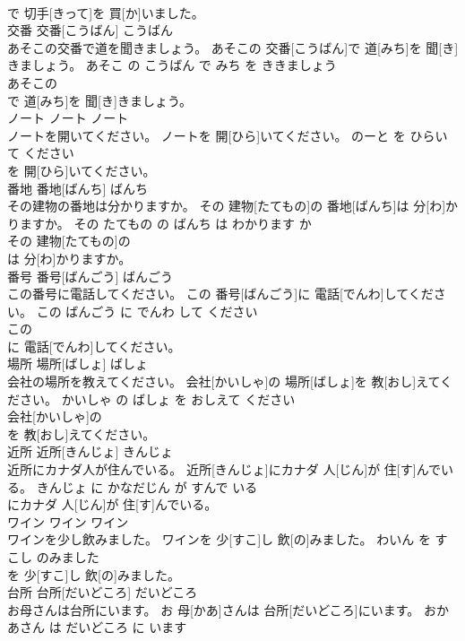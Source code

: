 \documentclass[8pt]{extreport}
\begin{document}
\begin{CJK}{UTF8}{min}
\\	で 切手[きって]を 買[か]いました。		
\\	交番	交番[こうばん]	こうばん	
\\	あそこの交番で道を聞きましょう。	あそこの 交番[こうばん]で 道[みち]を 聞[き]きましょう。	あそこ の こうばん で みち を ききましょう	
\\	あそこの
\\	で 道[みち]を 聞[き]きましょう。		
\\	ノート	ノート	ノート	
\\	ノートを開いてください。	ノートを 開[ひら]いてください。	のーと を ひらいて ください	
\\	を 開[ひら]いてください。		
\\	番地	番地[ばんち]	ばんち	
\\	その建物の番地は分かりますか。	その 建物[たてもの]の 番地[ばんち]は 分[わ]かりますか。	その たてもの の ばんち は わかります か	
\\	その 建物[たてもの]の
\\	は 分[わ]かりますか。		
\\	番号	番号[ばんごう]	ばんごう	
\\	この番号に電話してください。	この 番号[ばんごう]に 電話[でんわ]してください。	この ばんごう に でんわ して ください	
\\	この
\\	に 電話[でんわ]してください。		
\\	場所	場所[ばしょ]	ばしょ	
\\	会社の場所を教えてください。	会社[かいしゃ]の 場所[ばしょ]を 教[おし]えてください。	かいしゃ の ばしょ を おしえて ください	
\\	会社[かいしゃ]の
\\	を 教[おし]えてください。		
\\	近所	近所[きんじょ]	きんじょ	
\\	近所にカナダ人が住んでいる。	近所[きんじょ]にカナダ 人[じん]が 住[す]んでいる。	きんじょ に かなだじん が すんで いる	
\\	にカナダ 人[じん]が 住[す]んでいる。		
\\	ワイン	ワイン	ワイン	
\\	ワインを少し飲みました。	ワインを 少[すこ]し 飲[の]みました。	わいん を すこし のみました	
\\	を 少[すこ]し 飲[の]みました。		
\\	台所	台所[だいどころ]	だいどころ	
\\	お母さんは台所にいます。	お 母[かあ]さんは 台所[だいどころ]にいます。	おかあさん は だいどころ に います	

\end{CJK}
\end{document}
